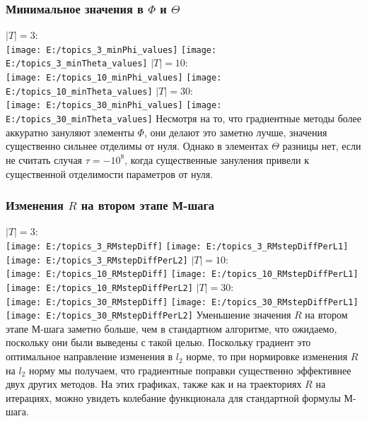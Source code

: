 \documentclass[12pt]{article}
\begin{document}
\subsubsection{Минимальное значения в $\Phi$ и $\Theta$}
$|T| = 3$:\\
\texttt{[image: E:/topics\_3\_minPhi\_values]}
\texttt{[image: E:/topics\_3\_minTheta\_values]}
\newpage
$|T| = 10$:\\
\texttt{[image: E:/topics\_10\_minPhi\_values]}
\texttt{[image: E:/topics\_10\_minTheta\_values]}
\newpage
$|T| = 30$:\\
\texttt{[image: E:/topics\_30\_minPhi\_values]}
\texttt{[image: E:/topics\_30\_minTheta\_values]}
Несмотря на то, что градиентные методы более аккуратно  зануляют элементы $\Phi$, они делают это заметно лучше, значения существенно сильнее отделимы от нуля. Однако в элементах $\Theta$ разницы нет, если не считать случая $\tau = -10^{8}$, когда существенные зануления привели к существенной отделимости параметров от нуля.
\subsubsection{Изменения $R$ на втором этапе М-шага}
$|T| = 3$:\\
\texttt{[image: E:/topics\_3\_RMstepDiff]}
\texttt{[image: E:/topics\_3\_RMstepDiffPerL1]}
\texttt{[image: E:/topics\_3\_RMstepDiffPerL2]}
$|T| = 10$:\\
\texttt{[image: E:/topics\_10\_RMstepDiff]}
\texttt{[image: E:/topics\_10\_RMstepDiffPerL1]}
\texttt{[image: E:/topics\_10\_RMstepDiffPerL2]}
\newpage
$|T| = 30$:\\
\texttt{[image: E:/topics\_30\_RMstepDiff]}
\texttt{[image: E:/topics\_30\_RMstepDiffPerL1]}
\texttt{[image: E:/topics\_30\_RMstepDiffPerL2]}
Уменьшение значения $R$ на втором этапе М-шага заметно больше, чем в стандартном алгоритме, что ожидаемо, поскольку они были выведены с такой целью. Поскольку градиент это оптимальное направление изменения в $l_2$ норме, то при нормировке изменения $R$ на $l_2$ норму мы получаем, что градиентные поправки существенно эффективнее двух других методов. На этих графиках, также как и на траекториях $R$ на итерациях, можно увидеть колебание функционала для стандартной формулы М-шага.
\end{document}

